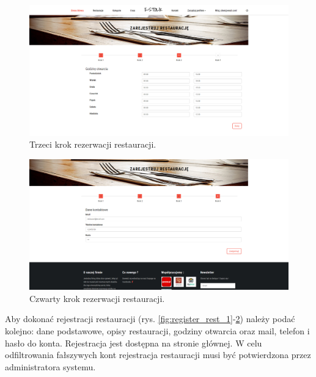 \documentclass{article}
\begin{document}
\begin{figure}[H]
\centering
	\includegraphics[width=1.00\textwidth]{screens/register_rest_3.png}
	\caption[caption]{Trzeci krok rezerwacji restauracji.}
	\label{fig:register_rest_3}
\end{figure}

\begin{figure}[H]
\centering
	\includegraphics[width=1.00\textwidth]{screens/register_rest_4.png}
	\caption[caption]{Czwarty krok rezerwacji restauracji.}
	\label{fig:register_rest_4}
\end{figure}

Aby dokonać rejestracji restauracji (rys. \ref{fig:register_rest_1}-\ref{fig:register_rest_4}) należy podać kolejno: dane podstawowe, opisy restauracji, godziny otwarcia oraz mail, telefon i hasło do konta. Rejestracja jest dostępna na stronie głównej. W celu odfiltrowania fałszywych kont rejestracja restauracji musi być potwierdzona przez administratora systemu.
\end{document}
